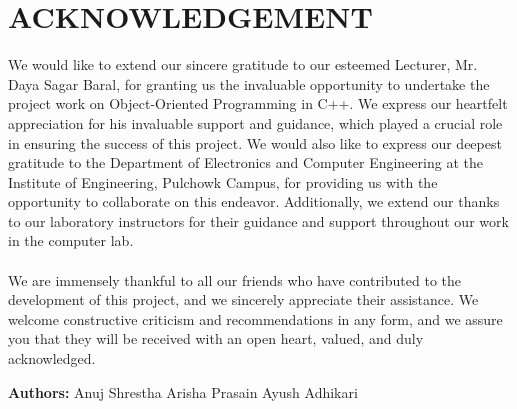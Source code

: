 \newpage
\section*{ACKNOWLEDGEMENT}

We would like to extend our sincere gratitude to our esteemed Lecturer, Mr. Daya Sagar Baral, for granting us the invaluable opportunity to undertake the project work on Object-Oriented Programming in C++. We express our heartfelt appreciation for his invaluable support and guidance, which played a crucial role in ensuring the success of this project. We would also like to express our deepest gratitude to the Department of Electronics and Computer Engineering at the Institute of Engineering, Pulchowk Campus, for providing us with the opportunity to collaborate on this endeavor. Additionally, we extend our thanks to our laboratory instructors for their guidance and support throughout our work in the computer lab.
\\\\
We are immensely thankful to all our friends who have contributed to the development of this project, and we sincerely appreciate their assistance. We welcome constructive criticism and recommendations in any form, and we assure you that they will be received with an open heart, valued, and duly acknowledged.

\vskip 8mm
\begin{flushleft}
	{\bf Authors:}
	\newline Anuj Shrestha
	\newline Arisha Prasain
	\newline Ayush Adhikari		
\end{flushleft}